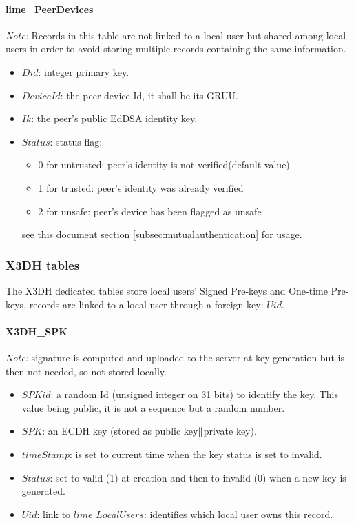 \documentclass[a4paper,11pt]{article}
\begin{document}
    \paragraph*{lime\_PeerDevices}
    \textit{Note:} Records in this table are not linked to a local user but shared among local users in order to avoid storing multiple records containing the same information.
    \begin{itemize}
      \item $Did$: integer primary key.
      \item $DeviceId$: the peer device Id, it shall be its GRUU.
      \item $Ik$: the peer's public EdDSA identity key.
      \item $Status$: status flag:
        \begin{itemize}
          \item 0 for untrusted: peer's identity is not verified(default value)
          \item 1 for trusted: peer's identity was already verified
          \item 2 for unsafe: peer's device has been flagged as unsafe
        \end{itemize}
        see this document section \ref{subsec:mutualauthentication} for usage.
    \end{itemize}
    
    \subsubsection{X3DH tables}
    The X3DH dedicated tables store local users' Signed Pre-keys and One-time Pre-keys, records are linked to a local user through a foreign key: $Uid$.
    \paragraph*{X3DH\_SPK}
    \textit{Note:} signature is computed and uploaded to the server at key generation but is then not needed, so not stored locally.
    \begin{itemize}
      \item $SPKid$: a random Id (unsigned integer on 31 bits) to identify the key. This value being public, it is not a sequence but a random number.
      \item $SPK$: an ECDH key (stored as public key$\Arrowvert $private key).
      \item $timeStamp$: is set to current time when the key status is set to invalid.
      \item $Status$: set to valid (1) at creation and then to invalid (0) when a new key is generated.
      \item $Uid$: link to $lime\_LocalUsers$: identifies which local user owns this record.
    \end{itemize}
  
\end{document}
